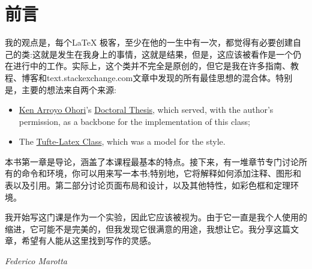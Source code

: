 \chapter*{前言}

我的观点是，每个\LaTeX \xspace 极客，至少在他的一生中有一次，都觉得有必要创建自己的类:这就是发生在我身上的事情，这就是结果，但是，这应该被看作是一个仍在进行中的工作。实际上，这个类并不完全是原创的，但它是我在许多指南、教程、博客和text.stackexchange.com文章中发现的所有最佳思想的混合体。特别是，主要的想法来自两个来源:

\begin{itemize}
	\item \href{https://3d.bk.tudelft.nl/ken/en/}{Ken Arroyo Ohori}'s 
		\href{ttps://3d.bk.tudelft.nl/ken/en/nl/ken/en/2016/04/17/a-1.5-column-layout-in-latex.html}{Doctoral 
			Thesis}, which served, with the author's permission, as a 
		backbone for the implementation of this class;
	\item The 
		\href{https://github.com/Tufte-LaTeX/tufte-latex}{Tufte-Latex 
			Class}, which was a model for the style.
\end{itemize}

本书第一章是导论，涵盖了本课程最基本的特点。接下来，有一堆章节专门讨论所有的命令和环境，你可以用来写一本书;特别地，它将解释如何添加注释、图形和表以及引用。第二部分讨论页面布局和设计，以及其他特性，如彩色框和定理环境。

我开始写这门课是作为一个实验，因此它应该被视为。由于它一直是我个人使用的缩进，它可能不是完美的，但我发现它很满意的用途，我想让它。我分享这篇文章，希望有人能从这里找到写作的灵感。

\begin{flushright}
	\textit{Federico Marotta}
\end{flushright}
